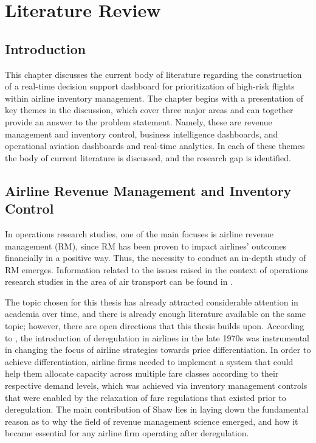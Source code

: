 \chapter{Literature Review}
\label{ch:literature}

\section{Introduction}

This chapter discusses the current body of literature regarding the construction of a real-time decision support dashboard for prioritization of high-risk flights within airline inventory management. The chapter begins with a presentation of key themes in the discussion, which cover three major areas and can together provide an answer to the problem statement. Namely, these are revenue management and inventory control, business intelligence dashboards, and operational aviation dashboards and real-time analytics. In each of these themes the body of current literature is discussed, and the research gap is identified.

\section{Airline Revenue Management and Inventory Control}
\label{sec:ch2:rm}

In operations research studies, one of the main focuses is airline revenue management (RM), since RM has been proven to impact airlines' outcomes financially in a positive way. Thus, the necessity to conduct an in-depth study of RM emerges. Information related to the issues raised in the context of operations research studies in the area of air transport can be found in \citet{BarnhartBelobabaOdoni2003}.

The topic chosen for this thesis has already attracted considerable attention in academia over time, and there is already enough literature available on the same topic; however, there are open directions that this thesis builds upon. According to \citet{Shaw2016}, the introduction of deregulation in airlines in the late 1970s was instrumental in changing the focus of airline strategies towards price differentiation. In order to achieve differentiation, airline firms needed to implement a system that could help them allocate capacity across multiple fare classes according to their respective demand levels, which was achieved via inventory management controls that were enabled by the relaxation of fare regulations that existed prior to deregulation. The main contribution of Shaw lies in laying down the fundamental reason as to why the field of revenue management science emerged, and how it became essential for any airline firm operating after deregulation.

